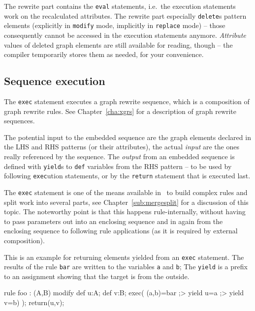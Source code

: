 The rewrite part contains the \texttt{eval} statements, i.e.\ the execution statements work on the recalculated attributes.
The rewrite part especially \texttt{delete}s pattern elements (explicitly in \texttt{modify} mode, implicitly in \texttt{replace} mode) -- those consequently cannot be accessed in the execution statements anymore.
\emph{Attribute} values of deleted graph elements are still available for reading, though -- the compiler temporarily stores them as needed, for your convenience.

\subsection*{Sequence execution}
The \texttt{exec} statement executes a graph rewrite sequence, which is a composition of graph rewrite rules.
See Chapter~\ref{cha:xgrs} for a description of graph rewrite sequences.

The potential input to the embedded sequence are the graph elements declared in the LHS and RHS patterns (or their attributes), the actual \emph{input} are the ones really referenced by the sequence. 
The \emph{output} from an embedded sequence is defined with \texttt{yield}s to \texttt{def} variables from the RHS pattern --
to be used by following \texttt{exec}ution statements, or by the \texttt{return} statement that is executed last.  

The \texttt{exec} statement is one of the means available in \GrG~to build complex rules and split work into several parts, see Chapter~\ref{sub:mergesplit} for a discussion of this topic. The noteworthy point is that this happens rule-internally, without having to pass parameters out into an enclosing sequence and in again from the enclosing sequence to following rule applications (as it is required by external composition).

\begin{example}
This is an example for returning elements yielded from an \texttt{exec} statement.
The results of the rule \texttt{bar} are written to the variables \texttt{a} and \texttt{b};
The \texttt{yield} is a prefix to an assignment showing that the target is from the outside.

	\begin{grgen}
rule foo : (A,B)
{
  modify {
    def u:A; def v:B;
    exec( (a,b)=bar ;> yield u=a ;> yield v=b) );
    return(u,v);
  }
}
	\end{grgen}
\end{example}

